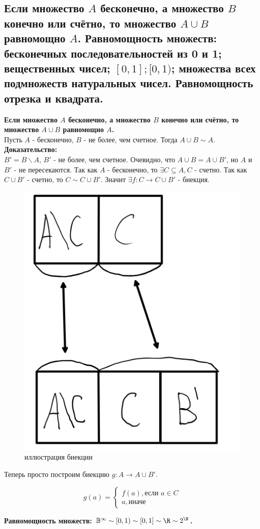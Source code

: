 \subsection{Если множество $A$ бесконечно, а множество $B$ конечно или счётно, то множество $A \cup B$ равномощно $A$. Равномощность множеств: бесконечных последовательностей из 0 и 1; вещественных чисел; $[0, 1]; [0, 1)$; множества всех подмножеств натуральных чисел. Равномощность отрезка и квадрата.}
\textbf{Если множество $A$ бесконечно, а множество $B$ конечно или счётно, то множество $A \cup B$ равномощно $A$.}\\

Пусть $A$ - бесконечно, $B$ - не более, чем счетное. Тогда $A \cup B \sim A$.\\

\noindent \textbf{Доказательство:} \\

$B' = B \backslash A$, $B'$ - не более, чем счетное. Очевидно, что $A \cup B = A \cup B'$, но $A$ и $B'$ - не пересекаются.
Так как $A$ - бесконечно, то $\exists C \subseteq A, C$ - счетно. Так как $C \cup B'$ - счетно, то $C \sim C \cup B'$. Значит
$\exists f : C \to C \cup B'$ - биекция.

\begin{figure}[H]
\centering
\includegraphics[width=0.3\linewidth]{proofs/images/question16.png}
\caption{иллюстрация биекции}
\end{figure}

Теперь просто построим биекцию $g : A \to A \cup B'$.

\begin{equation*}
    g(a) = \begin{cases}
        f(a), \text{если } a \in C\\
        a, \text{иначе}
    \end{cases}
\end{equation*}

\textbf{Равномощность множеств: $\mathbb{B}^{\infty} \sim [0, 1) \sim [0,1] \sim \R \sim 2^{\N}$.}\\

